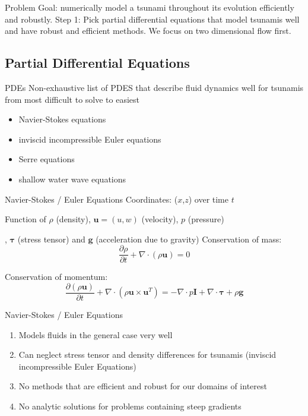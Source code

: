 \documentclass[pdf]{beamer}
\begin{document}
\begin{frame}{Problem}
Goal: numerically model a tsunami throughout its evolution efficiently and robustly.
\vskip 0.2cm
Step 1: Pick partial differential equations that model tsunamis well and have robust and efficient methods. We focus on two dimensional flow first.

\end{frame}

\subsection{Partial Differential Equations}
\begin{frame}{PDEs}
Non-exhaustive list of PDES that describe fluid dynamics well for tsunamis from most difficult to solve to easiest
\begin{itemize}
\item Navier-Stokes equations
\item inviscid incompressible Euler equations
\item Serre equations
\item shallow water wave equations
\end{itemize}
\end{frame}

\begin{frame}{Navier-Stokes / Euler Equations}
Coordinates: ($x$,$z$) over time $t$

Function of $\rho$ (density), $\mathbf{u} = (u,w)$ (velocity), $p$ (pressure)

 , $\boldsymbol{\tau}$ (stress tensor) and $\mathbf{g}$ (acceleration due to gravity)
\vskip 0.2cm
Conservation of mass:	
\[\frac{\partial \rho}{\partial t} +  \nabla \cdot \left(\rho \mathbf{u}\right) = 0\]

Conservation of momentum:
\[ \frac{\partial \left(\rho\mathbf{u} \right)}{\partial t} + \nabla \cdot \left(\rho \mathbf{u} \times \mathbf{u}^T  \right) =  - \nabla\cdot p \mathbf{I} + \nabla \cdot \boldsymbol{\tau} + \rho \mathbf{g}\]

\end{frame}

\begin{frame}{Navier-Stokes / Euler Equations}
		
\begin{enumerate}
	\item Models fluids in the general case very well
	\pause
	\item Can neglect stress tensor and density differences for tsunamis (inviscid incompressible Euler Equations)
	\pause
	\item No methods that are efficient and robust for our domains of interest
	\pause
	\item No analytic solutions for problems containing steep gradients
\end{enumerate}
\end{frame}
\end{document}

